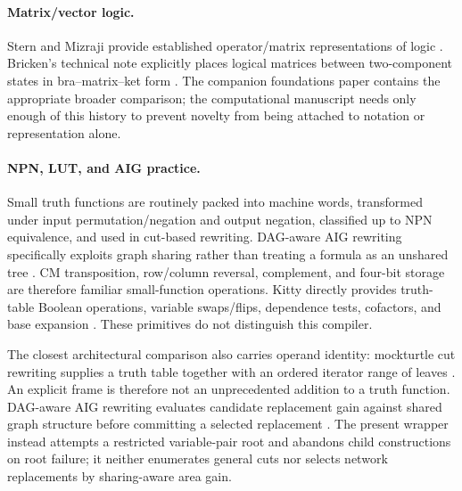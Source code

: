 \documentclass[10pt]{article}
\theoremstyle{plain}
\theoremstyle{definition}
\theoremstyle{remark}
\begin{document}
\paragraph{Matrix/vector logic.}
Stern and Mizraji provide established operator/matrix representations of logic \cite{Stern1988,Mizraji1992,Mizraji2008}. Bricken's technical note explicitly places logical matrices between two-component states in bra--matrix--ket form \cite{Bricken1997}. The companion foundations paper contains the appropriate broader comparison; the computational manuscript needs only enough of this history to prevent novelty from being attached to notation or representation alone.

\paragraph{NPN, LUT, and AIG practice.}
Small truth functions are routinely packed into machine words, transformed under input permutation/negation and output negation, classified up to NPN equivalence, and used in cut-based rewriting. DAG-aware AIG rewriting specifically exploits graph sharing rather than treating a formula as an unshared tree \cite{Mishchenko2006,Zhou2019,Testa2019}. CM transposition, row/column reversal, complement, and four-bit storage are therefore familiar small-function operations. Kitty directly provides truth-table Boolean operations, variable swaps/flips, dependence tests, cofactors, and base expansion \cite{KittyOperations}. These primitives do not distinguish this compiler.

The closest architectural comparison also carries operand identity: mockturtle cut rewriting supplies a truth table together with an ordered iterator range of leaves \cite{MockturtleCut}. An explicit frame is therefore not an unprecedented addition to a truth function. DAG-aware AIG rewriting evaluates candidate replacement gain against shared graph structure before committing a selected replacement \cite{Mishchenko2006}. The present wrapper instead attempts a restricted variable-pair root and abandons child constructions on root failure; it neither enumerates general cuts nor selects network replacements by sharing-aware area gain.
\end{document}

